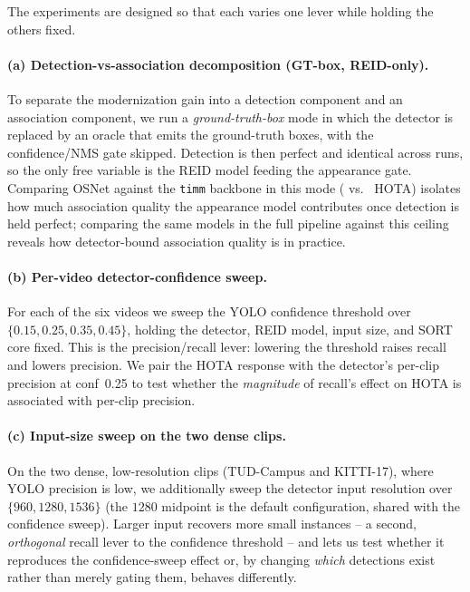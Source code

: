 The experiments are designed so that each varies one lever while holding the others fixed.

\paragraph{(a) Detection-vs-association decomposition (GT-box, REID-only).}
To separate the modernization gain into a detection component and an association component, we run a
\emph{ground-truth-box} mode in which the detector is replaced by an oracle that emits the ground-truth
boxes, with the confidence/NMS gate skipped. Detection is then perfect and identical across runs, so
the only free variable is the REID model feeding the appearance gate. Comparing OSNet against the
\texttt{timm} backbone in this mode (\osnetGT{} vs.\ \timmGT{} HOTA) isolates how much association
quality the appearance model contributes once detection is held perfect; comparing the same models in
the full pipeline against this ceiling reveals how detector-bound association quality is in practice.

\paragraph{(b) Per-video detector-confidence sweep.}
For each of the six videos we sweep the YOLO confidence threshold over
$\{0.15, 0.25, 0.35, 0.45\}$, holding the detector, REID model, input size, and SORT core fixed. This
is the precision/recall lever: lowering the threshold raises recall and lowers precision. We pair the
HOTA response with the detector's per-clip precision at conf~0.25 to test whether the \emph{magnitude}
of recall's effect on HOTA is associated with per-clip precision.

\paragraph{(c) Input-size sweep on the two dense clips.}
On the two dense, low-resolution clips (TUD-Campus and KITTI-17), where YOLO precision is low, we
additionally sweep the detector input resolution over $\{960, 1280, 1536\}$ (the $1280$ midpoint is the
default configuration, shared with the confidence sweep). Larger input recovers
more small instances -- a second, \emph{orthogonal} recall lever to the confidence threshold -- and
lets us test whether it reproduces the confidence-sweep effect or, by changing \emph{which} detections
exist rather than merely gating them, behaves differently.

